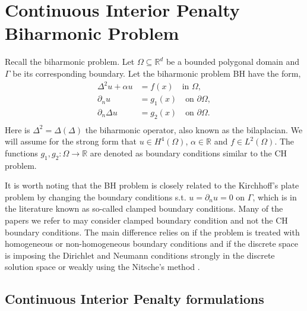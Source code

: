 
\newpage
\section{Continuous Interior Penalty Biharmonic Problem }%
\label{sec:CIP_biharmonic_problem}

Recall the biharmonic problem.
Let $\Omega \subseteq    \mathbb{R} ^d$ be a bounded polygonal domain and $\Gamma $ be its corresponding boundary. Let the biharmonic problem BH have the form,
\begin{equation}
\label{eq:bi_problem}
\begin{split}
    \Delta^2  u  + \alpha  u  & = f( x)  \quad \text{in } \Omega,   \\
    \partial _{n} u & = g_{1}(x)   \quad \text{on } \partial \Omega,  \\
    \partial _{n} \Delta  u & = g_{2}( x)   \quad \text{on } \partial \Omega .  \\
\end{split}
\end{equation}
Here is $\Delta ^2 = \Delta  \left( \Delta  \right) $ the biharmonic operator, also known as the bilaplacian. We will assume for the strong form that $u \in H^{4}\left( \Omega  \right) $, $\alpha  \in  \mathbb{R} $ and $f \in L^{2}\left( \Omega  \right)
$. The functions $g_{1},g_{2}: \Omega  \to \mathbb{R}$ are denoted as boundary conditions similar to the CH problem.

\begin{remark}
It is worth noting that the BH problem is closely related to the Kirchhoff's plate problem by changing the boundary conditions s.t. $u = \partial _{n } u = 0$ on $\Gamma $, which is in the literature known as so-called clamped boundary conditions.
Many of the papers we refer to may consider clamped boundary condition and not the CH boundary conditions. The main difference relies on if the problem is treated with homogeneous or non-homogeneous boundary conditions and if the discrete space is
imposing the Dirichlet and Neumann conditions strongly in the discrete solution space or weakly using the Nitsche's method \cite{nitsche1971variationsprinzip}.
\end{remark}


\subsection{Continuous Interior Penalty formulations}%
\label{sub:continuous_interior_penalty_formulations}


